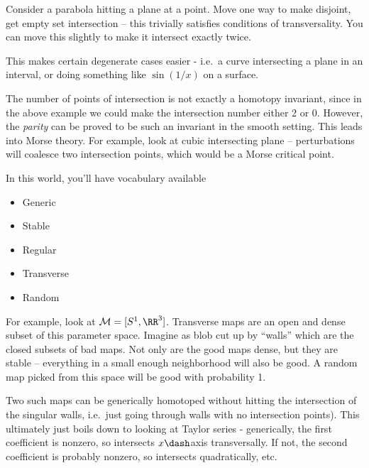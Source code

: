 \begin{example}

Consider a parabola hitting a plane at a point. Move one way to make
disjoint, get empty set intersection -- this trivially satisfies
conditions of transversality. You can move this slightly to make it
intersect exactly twice.

\end{example}

This makes certain degenerate cases easier - i.e.~a curve intersecting a
plane in an interval, or doing something like \(\sin(1/x)\) on a
surface.

The number of points of intersection is not exactly a homotopy
invariant, since in the above example we could make the intersection
number either 2 or 0. However, the \emph{parity} can be proved to be
such an invariant in the smooth setting. This leads into Morse theory.
For example, look at cubic intersecting plane -- perturbations will
coalesce two intersection points, which would be a Morse critical point.

In this world, you'll have vocabulary available

\begin{itemize}
\tightlist
\item
  Generic
\item
  Stable
\item
  Regular
\item
  Transverse
\item
  Random
\end{itemize}

\begin{example}

For example, look at \(\mathcal{M} = [S^1, \RR^3]\). Transverse maps are
an open and dense subset of this parameter space. Imagine as blob cut up
by ``walls'' which are the closed subsets of bad maps. Not only are the
good maps dense, but they are stable -- everything in a small enough
neighborhood will also be good. A random map picked from this space will
be good with probability 1.

Two such maps can be generically homotoped without hitting the
intersection of the singular walls, i.e.~just going through walls with
no intersection points). This ultimately just boils down to looking at
Taylor series - generically, the first coefficient is nonzero, so
intersects \(x\dash\)axis transversally. If not, the second coefficient
is probably nonzero, so intersects quadratically, etc.

\end{example}


